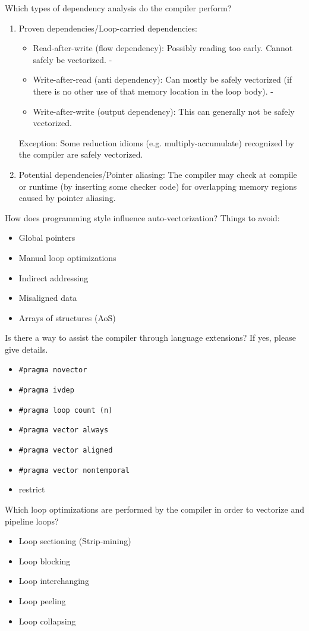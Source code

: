 \begin{frame}{Which types of dependency analysis do the compiler perform?}
\begin{enumerate}
\item Proven dependencies/Loop-carried dependencies:
\begin{itemize}
\item Read-after-write (flow dependency): Possibly reading too early. Cannot safely be vectorized.
-\item Write-after-read (anti dependency): Can mostly be safely vectorized (if there is no other use of that memory location in the loop body).
-\item Write-after-write (output dependency): This can generally not be safely vectorized.
\end{itemize}
Exception: Some reduction idioms (e.g. multiply-accumulate) recognized by the compiler are safely vectorized.
\item Potential dependencies/Pointer aliasing:
The compiler may check at compile or runtime (by inserting some checker code) for overlapping memory regions caused by pointer aliasing.
\end{enumerate}
\end{frame}

\begin{frame}{How does programming style influence auto-vectorization?}
Things to avoid:
\begin{itemize}
	\item Global pointers
	\item Manual loop optimizations
	\item Indirect addressing
	\item Misaligned data
	\item Arrays of structures (AoS)
\end{itemize}
\end{frame}

\begin{frame}{Is there a way to assist the compiler through language extensions? If yes, please give details.}
\begin{itemize}
\item \texttt{\#pragma novector}
\item \texttt{\#pragma ivdep}
\item \texttt{\#pragma loop count (n)}
\item \texttt{\#pragma vector always}
\item \texttt{\#pragma vector aligned}
\item \texttt{\#pragma vector nontemporal}
\item restrict
\end{itemize}
\end{frame}

\begin{frame}{Which loop optimizations are performed by the compiler in order to vectorize and pipeline loops?}
\begin{itemize}
\item Loop sectioning (Strip-mining)
\item Loop blocking
\item Loop interchanging
\item Loop peeling
\item Loop collapsing
\end{itemize}
\end{frame}
